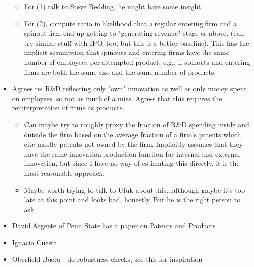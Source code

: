 \documentclass[12pt,english]{article}
\theoremstyle{remark}
\begin{document}
\begin{itemize}
\begin{itemize}
		\item For (1) talk to Steve Redding, he might have some insight
		\item For (2), compute ratio in likelihood that a regular entering firm and a spinout firm end up getting to "generating revenue" stage or above. (can try similar stuff with IPO, too, but this is a better baseline). This has the implicit assumption that spinouts and entering firms have the same number of employees per attempted product; e.g., if spinouts and entering firms are both the same size and the same number of products. 
	\end{itemize}
	\item Agrees re: R\&D reflecting only "own" innovation as well as only money spent on employees, so not as much of a miss. Agrees that this requires the reinterpretation of firms as products.
	\begin{itemize}
		\item Can maybe try to roughly proxy the fraction of R\&D spending inside and outside the firm based on the average fraction of a firm's patents which cite mostly patents not owned by the firm. Implicitly assumes that they have the same innovation production function for internal and external innovation, but since I have no way of estimating this directly, it is the most reasonable approach.
		\item Maybe worth trying to talk to Ufuk about this...although maybe it's too late at this point and looks bad, honestly. But he is the right person to ask. 
	\end{itemize}
	\item David Argente of Penn State has a paper on Patents and Products
	\item Ignacio Cuesta
	\item Oberfield Buera - do robustness checks, see this for inspiration
\end{itemize}
\end{document}
